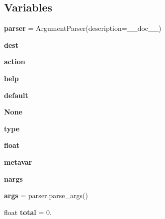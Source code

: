 \subsection*{Variables}
\begin{DoxyCompactItemize}
\item 
\mbox{\label{namespacepymavlink_1_1tools_1_1magfit_a6d0df36a846badadc38e61187a34d983}} 
{\bfseries parser} = Argument\+Parser(description=\+\_\+\+\_\+doc\+\_\+\+\_\+)
\item 
\mbox{\label{namespacepymavlink_1_1tools_1_1magfit_ab13797777b38a0ec1da04fc627f82e41}} 
{\bfseries dest}
\item 
\mbox{\label{namespacepymavlink_1_1tools_1_1magfit_a2e1257f700661cd49011aa5560b83c33}} 
{\bfseries action}
\item 
\mbox{\label{namespacepymavlink_1_1tools_1_1magfit_a61c609b29eadab7d3e1a4bb56151d329}} 
{\bfseries help}
\item 
\mbox{\label{namespacepymavlink_1_1tools_1_1magfit_af3df9e9d8eb7489c4c33ab7334f78a79}} 
{\bfseries default}
\item 
\mbox{\label{namespacepymavlink_1_1tools_1_1magfit_a69d7a14e5bd149f522bbff47a16358f5}} 
{\bfseries None}
\item 
\mbox{\label{namespacepymavlink_1_1tools_1_1magfit_a1df98baf6bc890d12b6fb2ff30f4da46}} 
{\bfseries type}
\item 
\mbox{\label{namespacepymavlink_1_1tools_1_1magfit_ae9ebf0687869ceb9dd1551f626a903eb}} 
{\bfseries float}
\item 
\mbox{\label{namespacepymavlink_1_1tools_1_1magfit_aafe560f3b36b24501e13ec291e683139}} 
{\bfseries metavar}
\item 
\mbox{\label{namespacepymavlink_1_1tools_1_1magfit_a07fda2900aadc9d19417fb63ef309e60}} 
{\bfseries nargs}
\item 
\mbox{\label{namespacepymavlink_1_1tools_1_1magfit_a9a02611f23b50f1c98394b7e9f20d666}} 
{\bfseries args} = parser.\+parse\+\_\+args()
\item 
\mbox{\label{namespacepymavlink_1_1tools_1_1magfit_a07593f30feed0b1ca4f16deba579e878}} 
float {\bfseries total} = 0.
\end{DoxyCompactItemize}



